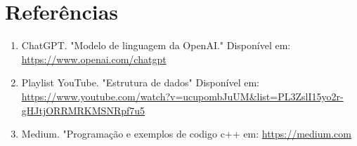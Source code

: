 \documentclass{article}
\begin{document}
\section{Referências}
\begin{enumerate}
    \item ChatGPT. "Modelo de linguagem da OpenAI." Disponível em: \url{https://www.openai.com/chatgpt}
    \item Playlist YouTube. "Estrutura de dados" Disponível em: \url{https://www.youtube.com/watch?v=ucupombJuUM&list=PL3ZslI15yo2r-gHJtjORRMRKMSNRpf7u5}
    \item Medium. "Programação e exemplos de codigo c++ em: \url{https://medium.com}
\end{enumerate}
\end{document}
